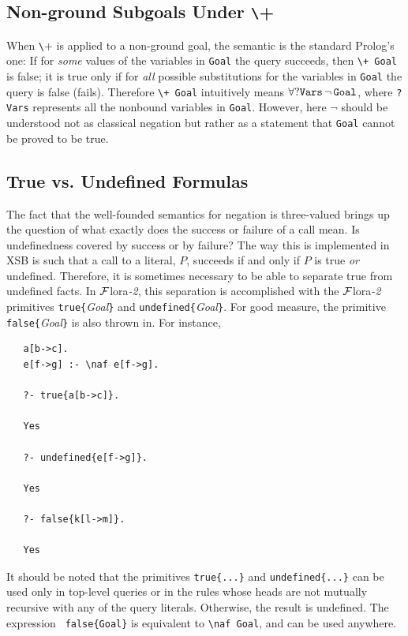 \documentclass[11pt]{article}
\newcommand{\FLORA}{{\mbox{\sc ${\cal F}${lora}\rm\emph{-2}}}\xspace}
\newcommand{\FLSYSTEM}{\FLORA}
\newcommand{\bs}{\textbackslash}
\newcommand{\PLGNAF}{\mbox{\texttt{\bs}+}\xspace}
\newcommand{\RULELOGNAF}{{\texttt{{\bs}naf}}\xspace}
\begin{document}
\subsection{Non-ground Subgoals Under \PLGNAF}

When \PLGNAF is applied to a non-ground goal, the semantic is the standard
Prolog's one: If for
\emph{some} values of the variables in {\tt Goal} the query succeeds,
then {\tt \PLGNAF\ Goal} is false; it is true only if for \emph{all} possible
substitutions for the variables in {\tt Goal} the query is false
(fails). Therefore {\tt \PLGNAF\ Goal} intuitively means $\tt\forall?Vars\,\neg\,Goal$, where {\tt ?Vars} represents all the nonbound variables
in {\tt Goal}. However, here $\neg$ should be understood not as classical
negation but rather as a statement that \texttt{Goal}  cannot be proved to be true.


\subsection{True vs. Undefined Formulas}

The fact that the well-founded semantics for negation is three-valued
brings up the question of what exactly does the success or failure of a
call mean. Is undefinedness covered by success or by failure?  The way
this is implemented in XSB is such that a call to a literal, $P$, succeeds
if and only if $P$ is true \emph{or} undefined.  Therefore, it is sometimes
necessary to be able to separate true from undefined facts. In \FLSYSTEM, this
separation is accomplished with the \FLSYSTEM primitives
{\tt true\{}\emph{Goal}{\tt \}} and {\tt undefined\{}\emph{Goal}{\tt \}}.
For good measure, the primitive {\tt false\{}\emph{Goal}{\tt \}} is also
thrown in. For instance,
\begin{verbatim}
   a[b->c].
   e[f->g] :- \naf e[f->g].

   ?- true{a[b->c]}.

   Yes

   ?- undefined{e[f->g]}.

   Yes

   ?- false{k[l->m]}.

   Yes
\end{verbatim}
It should be noted that the primitives {\tt true\{...\}}  and
{\tt undefined\{...\}} can be used only in top-level queries or in the
rules whose heads are not mutually recursive with any of the
query literals. Otherwise, the result is undefined. The expression {\tt
  false\{Goal\}} is equivalent to {\tt \RULELOGNAF Goal},  and can be used
anywhere.
\end{document}

